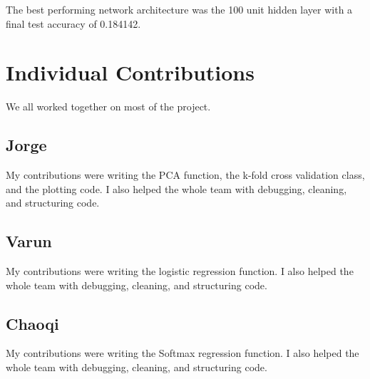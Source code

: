 \documentclass{article} %
\begin{document}
The best performing network architecture was the 100 unit hidden layer with a final test accuracy of 0.184142.

\section{Individual Contributions}
We all worked together on most of the project.

\subsection{Jorge}
My contributions were writing the PCA function, the k-fold cross validation class, and the plotting code. I also helped the whole team with debugging, cleaning, and structuring code.

\subsection{Varun}
My contributions were writing the logistic regression function. I also helped the whole team with debugging, cleaning, and structuring code.

\subsection{Chaoqi}
My contributions were writing the Softmax regression function. I also helped the whole team with debugging, cleaning, and structuring code.
\end{document}
